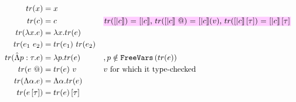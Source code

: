 \documentclass[10pt,a4paper]{article}
\newcommand\highlight[2]{{\setlength\fboxsep{1pt}\colorbox{#1}{#2}}}
\def\NV{\highlight{colorNV}}
\newcommand\trans[1]{\ensuremath{tr (#1)}}
\begin{document}
\begin{align*}
\trans{x} &=x \\
\trans{c} &= c && 
\NV{\trans{[|c|]} = ${[| c |]}$, 
    \trans{\epapp{[|c|]}} = $[|c|](v)$,
    \trans{\etapp{[|c|]}{\tau}} = \etapp{[|c|]}{\tau}} \\
\trans{\efun{x}{e}} &=\efun{x}{\trans{e}} \\
\trans{\eapp{e_1}{e_2}} &=\eapp{\trans{e_1}}{\trans{e_2}} \\
\trans{\epabs{p}{\tau}{e}} &=\efun{p}{\trans{e}} &&, p \notin \fv{\trans{e}} \\
\trans{\epapp{e}} &= \eapp{\trans{e}}{v} && v\ \text{for which it type-checked}\\
\trans{\etabs{\alpha}{e}} &=\etabs{\alpha}{\trans{e}} \\
\trans{\etapp{e}{\tau}} &=\etapp{\trans{e}}{\tau} \\
\end{align*}
\end{document}
